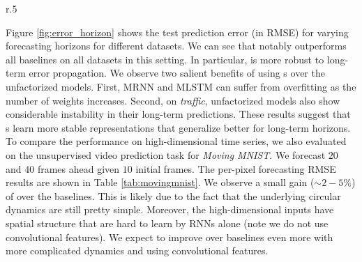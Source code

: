 \begin{wraptable}{r}{.5\linewidth}
\vspace{-22pt}
\begin{center}
\caption{Sequence-averaged per-pixel RMSE on Moving MNIST.}
\label{tab:movingmnist}
\end{center}
\vspace{-5mm}
\end{wraptable}
% 
%
Figure \ref{fig:error_horizon} shows the test prediction error (in RMSE) for varying forecasting horizons for different datasets.
%
We can see that \tlstm{} notably outperforms all baselines on all datasets in this setting. In particular, \tlstm{} is more robust to long-term error propagation.
%
We observe two salient benefits of using \trnn{}s over the unfactorized models.
%
First, MRNN and MLSTM can suffer from overfitting as the number of weights increases.
%
Second, on \textsl{traffic}, unfactorized models also show considerable instability in their long-term predictions.
%
These results suggest that \trnn{}s learn more stable representations that generalize better for long-term horizons.
To compare the performance on high-dimensional time series, we also evaluated on the unsupervised video prediction task for \textsl{Moving MNIST}. We forecast $20$ and $40$ frames ahead given $10$ initial frames. The per-pixel forecasting RMSE results are shown in Table \ref{tab:movingmnist}. We observe a small gain ($\sim 2-5\%$) of \tlstm{} over the baselines. This is likely due to the fact that the underlying circular dynamics are still pretty simple. Moreover, the high-dimensional inputs have spatial structure that are hard to learn by RNNs alone (note we do not use convolutional features). We expect \tlstm{} to improve over baselines even more with more complicated dynamics and using convolutional features.



